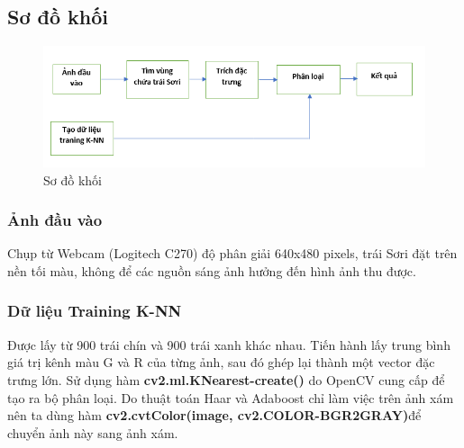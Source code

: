 \documentclass[12pt,a4paper]{article}
\begin{document}
\subsection{Sơ đồ khối}
\begin{center}
    \begin{figure}[htp]
    \begin{center}
    \includegraphics[scale=.8]{Images/blockKNN}
    \end{center}
    \caption{Sơ đồ khối}
    \end{figure}
\end{center}
\pagebreak
\subsubsection{Ảnh đầu vào}
Chụp từ Webcam (Logitech C270) độ phân giải 640x480 pixels, trái Sơri đặt trên nền tối màu, không để các nguồn sáng ảnh hưởng đến hình ảnh thu được.
\subsubsection{Dữ liệu Training K-NN}
Được lấy từ 900 trái chín và 900 trái xanh khác nhau. Tiến hành lấy trung bình giá trị kênh màu G và R của từng ảnh, sau đó ghép lại thành một vector đặc trưng lớn. Sử dụng hàm \textbf{cv2.ml.KNearest-create()} do OpenCV cung cấp để tạo ra bộ phân loại. Do thuật toán Haar và Adaboost chỉ làm việc trên ảnh xám nên ta dùng hàm \textbf{cv2.cvtColor(image, cv2.COLOR-BGR2GRAY)}để chuyển ảnh này sang ảnh xám.
\end{document}

